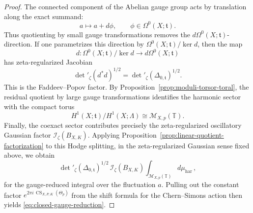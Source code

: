 \documentclass[10pt,a4paper]{amsart}
\begin{document}
\begin{proof}
The connected component of the Abelian gauge group acts by translation along the exact
summand:
\[
a\longmapsto a+d\phi,
\qquad
\phi\in \Omega^0(X;\mathfrak t).
\]
Thus quotienting by small gauge transformations removes the
\(d\Omega^0(X;\mathfrak t)\)-direction. If one parametrizes this direction by
\(\Omega^0(X;\mathfrak t)/\ker d\), then the map
\[
d:\Omega^0(X;\mathfrak t)/\ker d \longrightarrow d\Omega^0(X;\mathfrak t)
\]
has zeta-regularized Jacobian
\[
\det\nolimits'_{\zeta}(d^*d)^{1/2}
=
\det\nolimits'_{\zeta}(\Delta_{0,\mathfrak t})^{1/2}.
\]
This is the Faddeev--Popov factor. By Proposition~\ref{prop:moduli-torsor-toral},  the residual quotient by large gauge transformations identifies the harmonic
sector with the compact torus
\[
H^1(X;\mathfrak t)\big/ H^1(X;\Lambda)
\cong
\mathcal M_{X,p}(\mathbb T).
\]
Finally, the coexact sector contributes precisely the zeta-regularized oscillatory Gaussian
factor $\mathcal I_\zeta(B_{X,K}).$ Applying Proposition~\ref{prop:linear-quotient-factorization} to this Hodge splitting,
in the zeta-regularized Gaussian sense fixed above, we obtain
\[
\det\nolimits'_{\zeta}(\Delta_{0,\mathfrak t})^{1/2}\,
\mathcal I_\zeta(B_{X,K})\int_{\mathcal M_{X,p}(\mathbb T)} d\mu_{\mathrm{har}}\,,
\]
for the gauge-reduced integral over the fluctuation \(a\). Pulling out the constant factor $e^{2\pi i\,\operatorname{CS}_{X,P,K}(\Theta_p)}$
from the shift formula for the Chern--Simons action then yields
\eqref{eq:closed-gauge-reduction}.
\end{proof}
\end{document}
